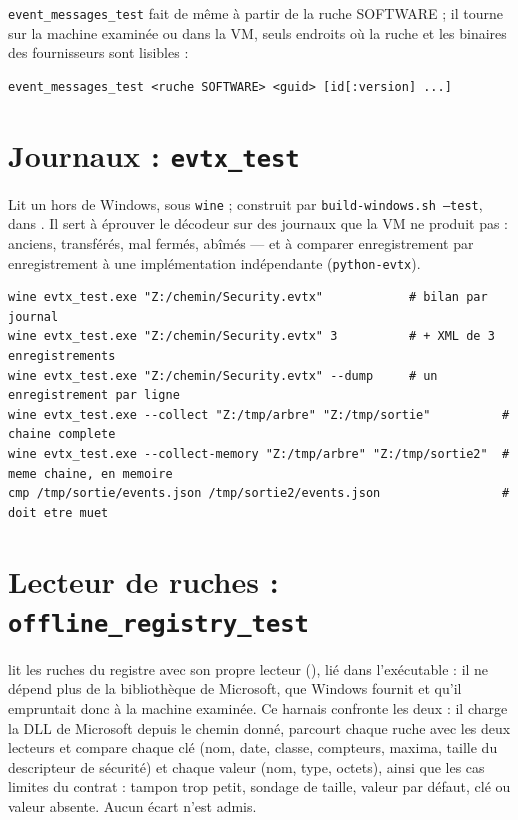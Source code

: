 \documentclass[11pt,a4paper,oneside]{report}
\begin{document}
\texttt{event\_messages\_test} fait de même à partir de la ruche SOFTWARE ; il
tourne sur la machine examinée ou dans la VM, seuls endroits où la ruche et les
binaires des fournisseurs sont lisibles :

\begin{lstlisting}
event_messages_test <ruche SOFTWARE> <guid> [id[:version] ...]
\end{lstlisting}

\section{Journaux : \texttt{evtx\_test}}

Lit un  hors de Windows, sous \texttt{wine} ; construit par
\texttt{build-windows.sh --test}, dans . Il sert à éprouver
le décodeur sur des journaux que la VM ne produit pas : anciens, transférés,
mal fermés, abîmés — et à comparer enregistrement par enregistrement à une
implémentation indépendante (\texttt{python-evtx}).

\begin{lstlisting}
wine evtx_test.exe "Z:/chemin/Security.evtx"            # bilan par journal
wine evtx_test.exe "Z:/chemin/Security.evtx" 3          # + XML de 3 enregistrements
wine evtx_test.exe "Z:/chemin/Security.evtx" --dump     # un enregistrement par ligne
wine evtx_test.exe --collect "Z:/tmp/arbre" "Z:/tmp/sortie"          # chaine complete
wine evtx_test.exe --collect-memory "Z:/tmp/arbre" "Z:/tmp/sortie2"  # meme chaine, en memoire
cmp /tmp/sortie/events.json /tmp/sortie2/events.json                 # doit etre muet
\end{lstlisting}


\section{Lecteur de ruches : \texttt{offline\_registry\_test}}

\wac{} lit les ruches du registre avec son propre lecteur
(), lié dans l'exécutable : il ne dépend plus
de la bibliothèque  de Microsoft, que Windows fournit et
qu'il empruntait donc à la machine examinée. Ce harnais confronte les deux :
il charge la DLL de Microsoft depuis le chemin donné, parcourt chaque ruche
avec les deux lecteurs et compare chaque clé (nom, date, classe, compteurs,
maxima, taille du descripteur de sécurité) et chaque valeur (nom, type,
octets), ainsi que les cas limites du contrat : tampon trop petit, sondage de
taille, valeur par défaut, clé ou valeur absente. Aucun écart n'est admis.
\end{document}
